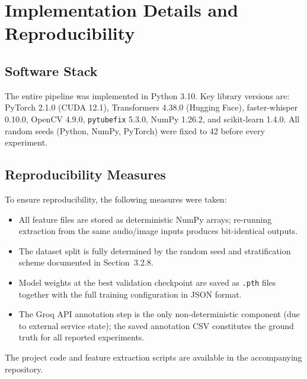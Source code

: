 \section{Implementation Details and Reproducibility}

\subsection{Software Stack}

The entire pipeline was implemented in Python 3.10. Key library versions are: PyTorch 2.1.0 (CUDA 12.1), Transformers 4.38.0 (Hugging Face), faster-whisper 0.10.0, OpenCV 4.9.0, \texttt{pytubefix} 5.3.0, NumPy 1.26.2, and scikit-learn 1.4.0. All random seeds (Python, NumPy, PyTorch) were fixed to 42 before every experiment.

\subsection{Reproducibility Measures}

To ensure reproducibility, the following measures were taken:
\begin{itemize}
    \item All feature files are stored as deterministic NumPy arrays; re-running extraction from the same audio/image inputs produces bit-identical outputs.
    \item The dataset split is fully determined by the random seed and stratification scheme documented in Section~3.2.8.
    \item Model weights at the best validation checkpoint are saved as \texttt{.pth} files together with the full training configuration in JSON format.
    \item The Groq API annotation step is the only non-deterministic component (due to external service state); the saved annotation CSV constitutes the ground truth for all reported experiments.
\end{itemize}

The project code and feature extraction scripts are available in the accompanying repository.

\newpage